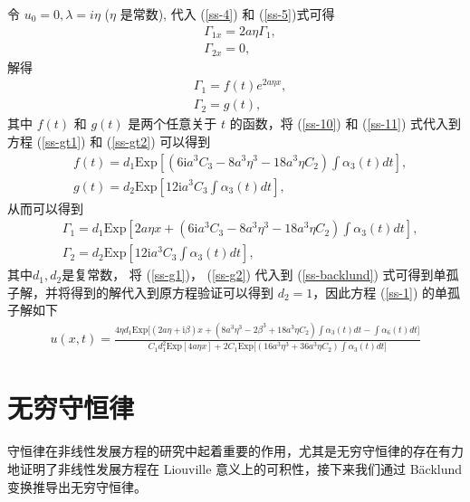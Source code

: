 令 $u_{0} = 0, \lambda = i\eta$ ($\eta$ 是常数), 代入 (\ref{ss-4}) 和  (\ref{ss-5})式可得
\begin{align}
  & \Gamma_{1x} = 2a\eta\Gamma_{1}, \\
  & \Gamma_{2x} = 0,
\end{align}
解得
\begin{align}
  & \Gamma_{1} = f(t)e^{2a\eta x},  \label{ss-10}\\
  & \Gamma_{2} = g(t), \label{ss-11}
\end{align}
其中 $f(t)$ 和 $g(t)$ 是两个任意关于  $t$ 的函数，将 (\ref{ss-10}) 和 (\ref{ss-11}) 式代入到方程 (\ref{ss-gt1}) 和 (\ref{ss-gt2}) 可以得到
\begin{align}
  & f(t) = d_{1}\mathrm{Exp}\left[(6\mathrm{i}a^{3}C_{3} - 8a^{3}\eta^{3} - 18a^{3}\eta C_{2})\int \alpha_{3}(t)dt\right], \\
  & g(t) = d_{2}\mathrm{Exp}\left[12\mathrm{i}a^{3}C_{3}\int \alpha_{3}(t)dt\right],
\end{align}
从而可以得到
\begin{align}
  & \Gamma_{1} = d_{1}\mathrm{Exp}\left[2a\eta x + (6\mathrm{i}a^{3}C_{3} - 8a^{3}\eta^{3} - 18a^{3}\eta C_{2})\int \alpha_{3}(t)dt\right], \label{ss-g1} \\
  & \Gamma_{2} = d_{2}\mathrm{Exp}\left[12\mathrm{i}a^{3}C_{3}\int \alpha_{3}(t)dt\right], \label{ss-g2}
\end{align}
其中$d_{1}, d_{2}$是复常数， 将  (\ref{ss-g1})， (\ref{ss-g2}) 代入到  (\ref{ss-backlund}) 式可得到单孤子解，并将得到的解代入到原方程验证可以得到 $d_{2} = 1$，因此方程 (\ref{ss-1}) 的单孤子解如下
\begin{align}
  u(x,t) = \frac{4\eta d_{1}\mathrm{Exp}\Big[(2a\eta+\mathrm{i}\beta)x + (8a^{3}\eta^{3} - 2\beta^{3} + 18a^{3}\eta C_{2})\int \alpha_{3}(t)dt - \int \alpha_{6}(t)dt\Big]}{C_1 d_{1}^{2}\mathrm{Exp}[4a\eta x] + 2C_1 \mathrm{Exp}\Big[(16a^{3}\eta^{3}+36a^{3}\eta C_{2})\int \alpha_{3}(t)dt\Big]}
\end{align}

\section{无穷守恒律}
守恒律在非线性发展方程的研究中起着重要的作用，尤其是无穷守恒律的存在有力地证明了非线性发展方程在 Liouville 意义上的可积性，接下来我们通过 B\"{a}cklund 变换推导出无穷守恒律。

